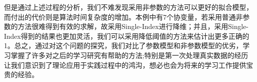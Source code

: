 \documentclass[a4paper,UTF8]{article}
\begin{document}
但是通过上述过程的分析，我们不难发现采用非参数的方法可以更好的拟合模型，而付出的代价则是算法时间复杂度的增加。本例中有7个协变量，若采用普通非参数的方法很难得到有效的求解，故采用Single-Index进行降维；并且，采用Single-Index得到的结果也更加灵活，我们可以采用降低阈值的方法来估计出更多正确的1。总之，通过对这个问题的探究，我们对比了参数模型和非参数模型的优劣，学习掌握了许多对之后的学习研究有帮助的方法;特别是第一次处理真实数据的经历让我们意识到了理论应用于实践过程中的鸿沟，想必也会为将来的学习工作提供宝贵的经验。


%
%
\end{document}
